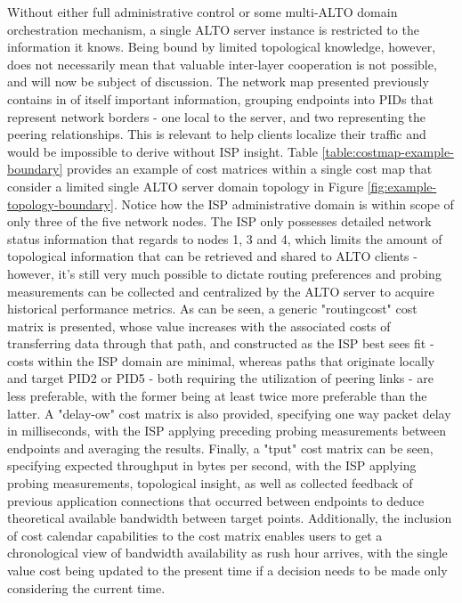     Without either full administrative control or some multi-ALTO domain orchestration mechanism, a single ALTO server instance is restricted to the information it knows.
    Being bound by limited topological knowledge, however, does not necessarily mean that valuable inter-layer cooperation is not possible, and will now be subject of discussion.
    The network map presented previously contains in of itself important information, grouping endpoints into PIDs that represent network borders - one local to the server, and two representing the peering relationships.
    This is relevant to help clients localize their traffic and would be impossible to derive without ISP insight.
    Table \ref{table:costmap-example-boundary} provides an example of cost matrices within a single cost map that consider a limited single ALTO server domain topology in Figure \ref{fig:example-topology-boundary}.
    Notice how the ISP administrative domain is within scope of only three of the five network nodes.
    The ISP only possesses detailed network status information that regards to nodes 1, 3 and 4, which limits the amount of topological information that can be retrieved and shared to ALTO clients - however, it's still very much possible to dictate routing preferences and probing measurements can be collected and centralized by the ALTO server to acquire historical performance metrics.
    As can be seen, a generic "routingcost" cost matrix is presented, whose value increases with the associated costs of transferring data through that path, and constructed as the ISP best sees fit - costs within the ISP domain are minimal, whereas paths that originate locally and target PID2 or PID5 - both requiring the utilization of peering links - are less preferable, with the former being at least twice more preferable than the latter.
    A "delay-ow" cost matrix is also provided, specifying one way packet delay in milliseconds, with the ISP applying preceding probing measurements between endpoints and averaging the results.
    Finally, a "tput" cost matrix can be seen, specifying expected throughput in bytes per second, with the ISP applying probing measurements, topological insight, as well as collected feedback of previous application connections that occurred between endpoints to deduce theoretical available bandwidth between target points.
    Additionally, the inclusion of cost calendar capabilities to the cost matrix enables users to get a chronological view of bandwidth availability as rush hour arrives, with the single value cost being updated to the present time if a decision needs to be made only considering the current time.
